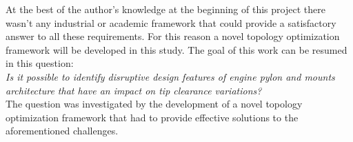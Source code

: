 At the best of the author's knowledge at the beginning of this project there wasn't any industrial or academic framework that could provide a satisfactory answer to all these requirements. For this reason a novel topology optimization framework will be developed in this study.
The goal of this work can be resumed in this question:\\
\textit{Is it possible to identify disruptive design features of engine pylon and mounts architecture that have an impact on tip clearance variations?} 
\\
The question was investigated by the development of a novel topology optimization framework that had to provide effective solutions to the aforementioned challenges.

